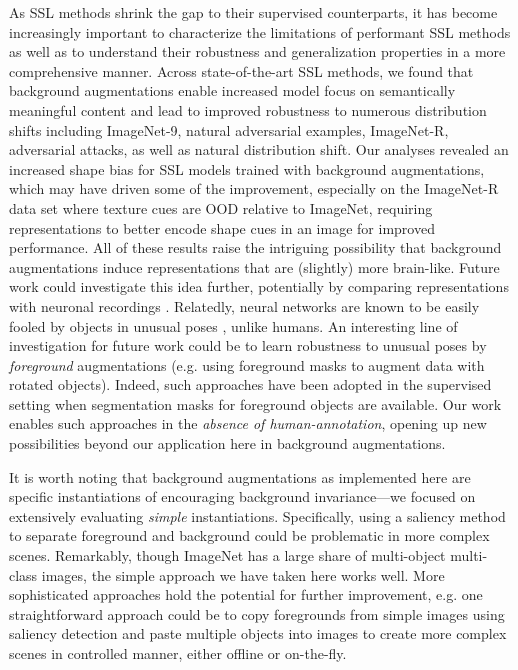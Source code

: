 \documentclass[twoside,11pt]{article}
\begin{document}
As SSL methods shrink the gap to their supervised counterparts, it has become increasingly important to characterize the limitations of performant SSL methods as well as to understand their robustness and generalization properties in a more comprehensive manner. Across state-of-the-art SSL methods, we found that background augmentations enable increased model focus on semantically meaningful content and lead to improved robustness to numerous distribution shifts including ImageNet-9, natural adversarial examples, ImageNet-R, adversarial attacks, as well as natural distribution shift. Our analyses revealed an increased shape bias for SSL models trained with background augmentations, which may have driven some of the improvement, especially on the ImageNet-R data set where texture cues are OOD relative to ImageNet, requiring representations to better encode shape cues in an image for improved performance. All of these results raise the intriguing possibility that background augmentations induce representations that are (slightly) more brain-like. Future work could investigate this idea further, potentially by comparing representations with neuronal recordings \citep{yamins_pnas_2014}. Relatedly, neural networks are known to be easily fooled by objects in unusual poses \citep{alcorn_strike_2019}, unlike humans. An interesting line of investigation for future work could be to learn robustness to unusual poses by \textit{foreground} augmentations (e.g. using foreground masks to augment data with rotated objects). Indeed, such approaches have been adopted in the supervised setting \citep[e.g.][]{Dwibedi_2017_ICCV, ghiasi2020simple} when segmentation masks for foreground objects are available. Our work enables such approaches in the \textit{absence of human-annotation}, opening up new possibilities beyond our application here in background augmentations.

It is worth noting that background augmentations as implemented here are specific instantiations of encouraging background invariance---we focused on extensively evaluating \textit{simple} instantiations. Specifically, using a saliency method to separate foreground and background could be problematic in more complex scenes. Remarkably, though ImageNet has a large share \citep[e.g.][]{stock_convnets_2018,beyer2020imagenetreal} of multi-object multi-class images, the simple approach we have taken here works well. More sophisticated approaches hold the potential for further improvement, e.g. one straightforward approach could be to copy foregrounds from simple images using saliency detection and paste multiple objects into images to create more complex scenes in controlled manner, either offline or on-the-fly.
\end{document}
